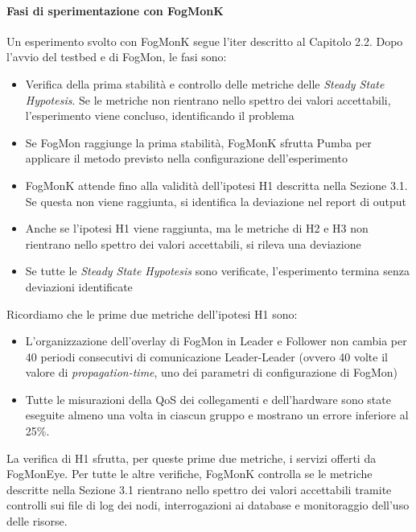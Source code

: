         \paragraph{Fasi di sperimentazione con FogMonK}\mbox{}\newline
        Un esperimento svolto con FogMonK segue l'iter descritto al Capitolo 2.2. Dopo l'avvio del testbed e di FogMon, le fasi sono:
        \begin{itemize}
            \item Verifica della prima stabilità e controllo delle metriche delle \textit{Steady State Hypotesis}. Se le metriche non rientrano nello spettro dei valori accettabili, l'esperimento viene concluso, identificando il problema
            \item Se FogMon raggiunge la prima stabilità, FogMonK sfrutta Pumba per applicare il metodo previsto nella configurazione dell'esperimento
            \item FogMonK attende fino alla validità dell'ipotesi H1 descritta nella Sezione 3.1. Se questa non viene raggiunta, si identifica la deviazione nel report di output
            \item Anche se l'ipotesi H1 viene raggiunta, ma le metriche di H2 e H3 non rientrano nello spettro dei valori accettabili, si rileva una deviazione
            \item Se tutte le \textit{Steady State Hypotesis} sono verificate, l'esperimento termina senza deviazioni identificate
        \end{itemize}
        Ricordiamo che le prime due metriche dell'ipotesi H1 sono:
        \begin{itemize}
            \item L'organizzazione dell'overlay di FogMon in Leader e Follower non cambia per 40 periodi consecutivi di comunicazione Leader-Leader (ovvero 40 volte il valore di \textit{propagation-time}, uno dei parametri di configurazione di FogMon)
            \item Tutte le misurazioni della QoS dei collegamenti e dell'hardware sono state eseguite almeno una volta in ciascun gruppo e mostrano un errore inferiore al 25\%.
        \end{itemize}
        La verifica di H1 sfrutta, per queste prime due metriche, i servizi offerti da FogMonEye. Per tutte le altre verifiche, FogMonK controlla se le metriche descritte nella Sezione 3.1 rientrano nello spettro dei valori accettabili tramite controlli sui file di log dei nodi, interrogazioni ai database e monitoraggio dell'uso delle risorse.
        
